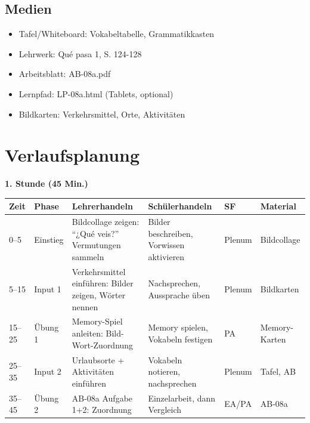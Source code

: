 \documentclass[11pt,a4paper]{article}
\newcommand{\lehrwerk}{Qué pasa 1}
\newcommand{\lehrwerkseite}{S. 124-128}
\begin{document}
\subsection{Medien}
\begin{itemize}
    \item Tafel/Whiteboard: Vokabeltabelle, Grammatikkasten
    \item Lehrwerk: \lehrwerk, \lehrwerkseite
    \item Arbeitsblatt: AB-08a.pdf
    \item Lernpfad: LP-08a.html (Tablets, optional)
    \item Bildkarten: Verkehrsmittel, Orte, Aktivitäten
\end{itemize}

\section{Verlaufsplanung}

\textbf{1. Stunde (45 Min.)}

\begin{longtable}{|p{1cm}|p{1.5cm}|p{4cm}|p{3cm}|p{1.5cm}|p{2cm}|}
\hline
\textbf{Zeit} & \textbf{Phase} & \textbf{Lehrerhandeln} & \textbf{Schülerhandeln} & \textbf{SF} & \textbf{Material} \\
\hline
\endhead

0--5 & Einstieg & Bildcollage zeigen: ``¿Qué veis?'' Vermutungen sammeln & Bilder beschreiben, Vorwissen aktivieren & Plenum & Bildcollage \\
\hline

5--15 & Input 1 & Verkehrsmittel einführen: Bilder zeigen, Wörter nennen & Nachsprechen, Aussprache üben & Plenum & Bildkarten \\
\hline

15--25 & Übung 1 & Memory-Spiel anleiten: Bild-Wort-Zuordnung & Memory spielen, Vokabeln festigen & PA & Memory-Karten \\
\hline

25--35 & Input 2 & Urlaubsorte + Aktivitäten einführen & Vokabeln notieren, nachsprechen & Plenum & Tafel, AB \\
\hline

35--45 & Übung 2 & AB-08a Aufgabe 1+2: Zuordnung & Einzelarbeit, dann Vergleich & EA/PA & AB-08a \\
\hline
\end{longtable}
\end{document}
